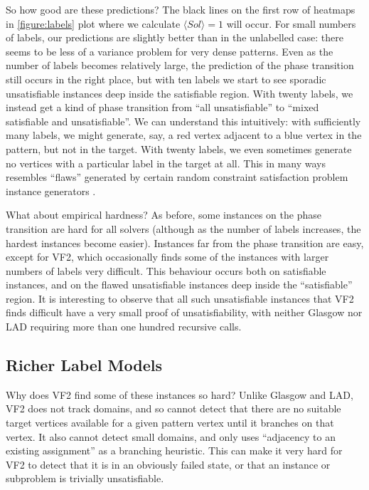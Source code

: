 \documentclass[twoside,11pt]{article}
\begin{document}
So how good are these predictions? The black lines on the first row of heatmaps in
\cref{figure:labels} plot where we calculate $\langle Sol \rangle = 1$ will occur. For small numbers
of labels, our predictions are slightly better than in the unlabelled case: there seems to be less
of a variance problem for very dense patterns. Even as the number of labels becomes relatively
large, the prediction of the phase transition still occurs in the right place, but with ten labels
we start to see sporadic unsatisfiable instances deep inside the satisfiable region. With twenty
labels, we instead get a kind of phase transition from ``all unsatisfiable'' to ``mixed satisfiable
and unsatisfiable''. We can understand this intuitively: with sufficiently many labels, we might
generate, say, a red vertex adjacent to a blue vertex in the pattern, but not in the target.  With
twenty labels, we even sometimes generate no vertices with a particular label in the target at all.
This in many ways resembles ``flaws'' generated by certain random constraint satisfaction problem
instance generators
\cite{DBLP:journals/constraints/AchlioptasMKSKK01,DBLP:journals/constraints/GentMPSW01}.

What about empirical hardness? As before, some instances on the phase transition are hard for all
solvers (although as the number of labels increases, the hardest instances become easier).
Instances far from the phase transition are easy, except for VF2, which occasionally finds
some of the instances with larger numbers of labels very difficult. This behaviour occurs both on
satisfiable instances, and on the flawed unsatisfiable instances deep inside the ``satisfiable''
region.  It is interesting to observe that all such unsatisfiable instances that VF2 finds difficult
have a very small proof of unsatisfiability, with neither Glasgow nor LAD requiring more than one
hundred recursive calls.

\subsection{Richer Label Models}\label{subsection:richer-labels}

Why does VF2 find some of these instances so hard? Unlike Glasgow and LAD, VF2 does not track
domains, and so cannot detect that there are no suitable target vertices available for a given
pattern vertex until it branches on that vertex.  It also cannot detect small domains, and only uses
``adjacency to an existing assignment'' as a branching heuristic. This can make it very hard for VF2
to detect that it is in an obviously failed state, or that an instance or subproblem is trivially
unsatisfiable.
\end{document}
